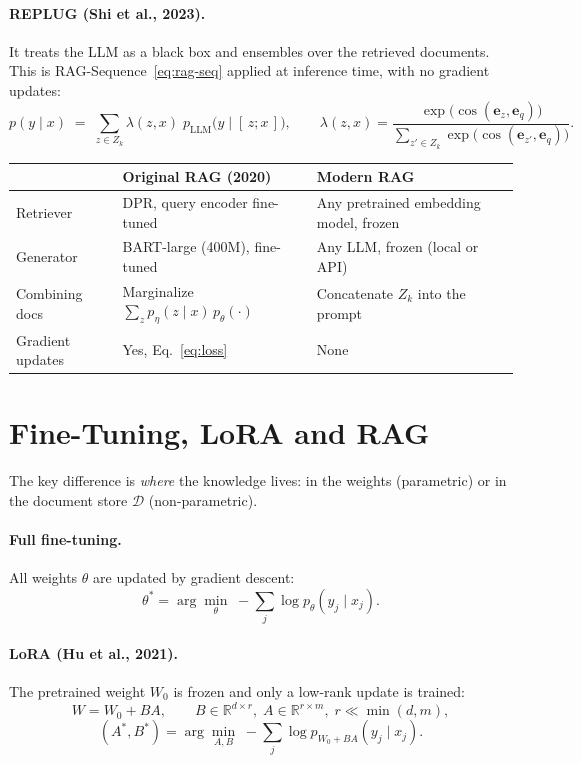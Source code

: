 \documentclass[11pt]{article}
\begin{document}
\paragraph{REPLUG (Shi et al., 2023).}
It treats the LLM as a black box and ensembles over the retrieved documents. This is RAG-Sequence~\eqref{eq:rag-seq} applied at inference time, with no gradient updates:
\begin{equation}
  p(y \mid x) \;=\; \sum_{z \in Z_k} \lambda(z, x)\; p_{\mathrm{LLM}}\big(y \mid [\,z; x\,]\big),
  \qquad
  \lambda(z, x) = \frac{\exp\big(\cos(\mathbf{e}_z,\mathbf{e}_q)\big)}{\sum_{z' \in Z_k}\exp\big(\cos(\mathbf{e}_{z'},\mathbf{e}_q)\big)}.
\end{equation}

\medskip
\begin{center}\small
\begin{tabular}{@{}lll@{}}
\toprule
 & Original RAG (2020) & Modern RAG \\
\midrule
Retriever & DPR, query encoder fine-tuned & Any pretrained embedding model, frozen \\
Generator & BART-large (400M), fine-tuned & Any LLM, frozen (local or API) \\
Combining docs & Marginalize $\sum_z p_\eta(z\mid x)\,p_\theta(\cdot)$ & Concatenate $Z_k$ into the prompt \\
Gradient updates & Yes, Eq.~\eqref{eq:loss} & None \\
\bottomrule
\end{tabular}
\end{center}

\section{Fine-Tuning, LoRA and RAG}

The key difference is \emph{where} the knowledge lives: in the weights (parametric) or in the document store $\mathcal{D}$ (non-parametric).

\paragraph{Full fine-tuning.} All weights $\theta$ are updated by gradient descent:
\begin{equation}
  \theta^\ast = \arg\min_{\theta} \; -\sum_j \log p_\theta(y_j \mid x_j).
\end{equation}

\paragraph{LoRA (Hu et al., 2021).} The pretrained weight $W_0$ is frozen and only a low-rank update is trained:
\begin{equation}
  W = W_0 + BA, \qquad B \in \mathbb{R}^{d \times r},\; A \in \mathbb{R}^{r \times m},\; r \ll \min(d, m),
\end{equation}
\begin{equation}
  (A^\ast, B^\ast) = \arg\min_{A,B} \; -\sum_j \log p_{W_0 + BA}(y_j \mid x_j).
\end{equation}
\end{document}

